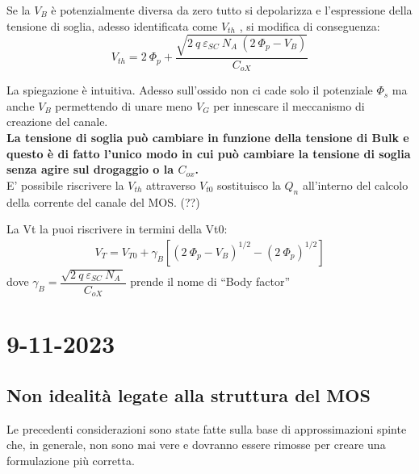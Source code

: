 Se la $V_B$ è potenzialmente diversa da zero tutto si depolarizza e l'espressione della tensione di soglia, adesso identificata come $V_{th}$ , si modifica di conseguenza:
\begin{equation}
    V_{th}=2\ \Phi_p+\frac{\sqrt{2\ q\ \varepsilon_{SC}\ N_A\ (2\ \Phi_p-V_B)}}{C_{oX}}
\end{equation}

La spiegazione è intuitiva. Adesso sull'ossido non ci cade solo il potenziale $\Phi_s$ ma anche $V_B$  permettendo di unare meno $V_G$ per innescare il meccanismo di creazione del canale.\\
\textbf{La tensione di soglia può cambiare in funzione della tensione di Bulk e questo è di fatto l'unico modo in cui può cambiare la tensione di soglia senza agire sul drogaggio o la $C_{ox}$.}\\
E' possibile riscrivere la $V_{th}$ attraverso $V_{t0}$
sostituisco la $Q_n$ all'interno del calcolo della corrente del canale del MOS. (??)

La Vt la puoi riscrivere in termini della Vt0:
\begin{align}
    V_T=V_{T0}+\gamma_B\left[\left(2\ \Phi_p-V_B\right)^{1/2}-\left(2\ \Phi_p\right)^{1/2}\right]
\end{align}
dove
$\gamma_B=\dfrac{\sqrt{2\ q\ \varepsilon_{SC}\ N_A\ }}{C_{oX}}$ prende il nome di  “Body factor”



\section*{9-11-2023}
\subsection{Non idealità legate alla struttura del MOS}
Le precedenti considerazioni sono state fatte sulla base di approssimazioni spinte che, in generale, non sono mai vere e dovranno essere rimosse per creare una formulazione più corretta.

